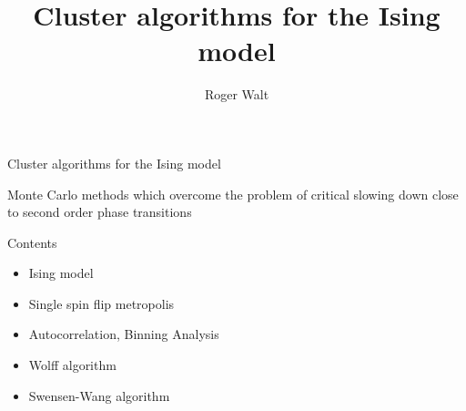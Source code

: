 \documentclass[]{beamer}
\begin{document}
\title{Cluster algorithms for the Ising model}
\author{Roger Walt}

\begin{frame}
	\huge{Cluster algorithms for the Ising model}
	\vspace*{5pt}

	\Large{Monte Carlo methods which overcome the problem of critical slowing down close to second order phase transitions}
\end{frame}

\begin{frame}{Contents}
\begin{itemize}
\item Ising model
\item Single spin flip metropolis
\item Autocorrelation, Binning Analysis
\item Wolff algorithm
\item Swensen-Wang algorithm
\end{itemize}
\end{frame}
\end{document}
